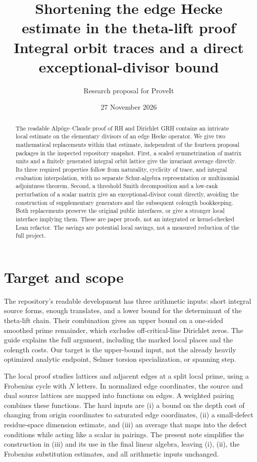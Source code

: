 \documentclass[11pt]{article}
\title{Shortening the edge Hecke estimate in the theta-lift proof\\[5pt]\large Integral orbit traces and a direct exceptional-divisor bound}
\author{Research proposal for ProveIt}
\date{27 November 2026}
\begin{document}
\maketitle
\begin{abstract}
The readable Alp\"oge--Claude proof of RH and Dirichlet GRH contains an intricate local estimate on the elementary divisors of an edge Hecke operator. We give two mathematical replacements within that estimate, independent of the fourteen proposal packages in the inspected repository snapshot. First, a scaled symmetrization of matrix units and a finitely generated integral orbit lattice give the invariant average directly. Its three required properties follow from naturality, cyclicity of trace, and integral evaluation interpolation, with no separate Schur-algebra representation or multinomial adjointness theorem. Second, a threshold Smith decomposition and a low-rank perturbation of a scalar matrix give an exceptional-divisor count directly, avoiding the construction of supplementary generators and the subsequent colength bookkeeping. Both replacements preserve the original public interfaces, or give a stronger local interface implying them. These are paper proofs, not an integrated or kernel-checked Lean refactor. The savings are potential local savings, not a measured reduction of the full project.
\end{abstract}
\tableofcontents

\section{Target and scope}
The repository's readable development has three arithmetic inputs: short integral source forms, enough translates, and a lower bound for the determinant of the theta-lift chain. Their combination gives an upper bound on a one-sided smoothed prime remainder, which excludes off-critical-line Dirichlet zeros. The guide explains the full argument, including the marked local places and the colength costs. Our target is the upper-bound input, not the already heavily optimized analytic endpoint, Selmer torsion specialization, or spanning step.

The local proof studies lattices and adjacent edges at a split local prime, using a Frobenius cycle with $N$ letters. In normalized edge coordinates, the source and dual source lattices are mapped into functions on edges. A weighted pairing combines these functions. The hard inputs are (i) a bound on the depth cost of changing from origin coordinates to saturated edge coordinates, (ii) a small-defect residue-space dimension estimate, and (iii) an average that maps into the defect conditions while acting like a scalar in pairings. The present note simplifies the construction in (iii) and its use in the final linear algebra, leaving (i), (ii), the Frobenius substitution estimates, and all arithmetic inputs unchanged.
\end{document}
